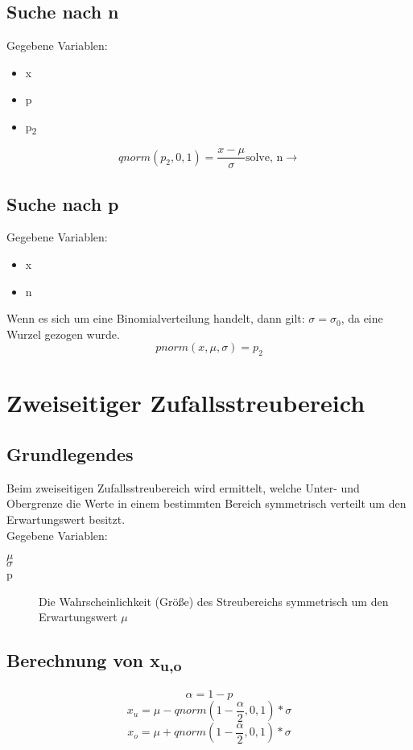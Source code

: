 \documentclass[a4paper,10pt]{article}
\begin{document}
\subsection{Suche nach n}
Gegebene Variablen:
\begin{itemize}
\item x
\item p
\item p\textsubscript{2}
\end{itemize}
\begin{equation}
  qnorm(p_2, 0, 1) = \frac{x -\mu}{\sigma} \text{solve, n} \rightarrow
\end{equation}

\subsection{Suche nach p}
Gegebene Variablen:
\begin{itemize}
\item x
\item n
\end{itemize}
Wenn es sich um eine Binomialverteilung handelt, dann gilt: $ \sigma =
\sigma_0 $, da eine Wurzel gezogen wurde.
\begin{equation}
  pnorm(x, \mu, \sigma) = p_2
\end{equation}

\section{Zweiseitiger Zufallsstreubereich}
\subsection{Grundlegendes}
Beim zweiseitigen Zufallsstreubereich wird ermittelt, welche Unter-
und Obergrenze die Werte in einem bestimmten Bereich symmetrisch
verteilt um den Erwartungswert besitzt.
\\
Gegebene Variablen:
\begin{description}
\item[$ \mu $]
\item[$ \sigma $]
\item[p] Die Wahrscheinlichkeit (Größe) des Streubereichs symmetrisch
  um den Erwartungswert $ \mu $
\end{description}

\subsection{Berechnung von x\textsubscript{u,o}}
\begin{equation}
  \alpha = 1 - p
\end{equation}
\begin{equation}
  x_u = \mu - qnorm(1 - \frac{\alpha}{2}, 0, 1) * \sigma
\end{equation}
\begin{equation}
  x_o = \mu + qnorm(1 - \frac{\alpha}{2}, 0, 1) * \sigma
\end{equation}
\end{document}
